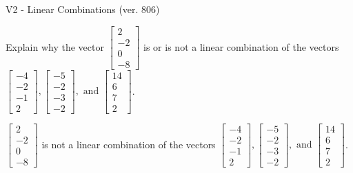 \begin{exercise}
  \begin{exerciseTitle}V2 - Linear Combinations (ver. 806)\end{exerciseTitle}
  \begin{exerciseStatement}
    Explain why the vector \(\left[\begin{array}{c}
2 \\
-2 \\
0 \\
-8
\end{array}\right]\)  is or is not a linear 
	combination of the vectors \(\left[\begin{array}{c}
-4 \\
-2 \\
-1 \\
2
\end{array}\right] , \left[\begin{array}{c}
-5 \\
-2 \\
-3 \\
-2
\end{array}\right] , \text{ and } \left[\begin{array}{c}
14 \\
6 \\
7 \\
2
\end{array}\right]\).
	


  \end{exerciseStatement}
  \begin{exerciseAnswer}
   \(\left[\begin{array}{c}
2 \\
-2 \\
0 \\
-8
\end{array}\right]\) 
  	 is not  
	a linear combination of the vectors \(\left[\begin{array}{c}
-4 \\
-2 \\
-1 \\
2
\end{array}\right] , \left[\begin{array}{c}
-5 \\
-2 \\
-3 \\
-2
\end{array}\right] , \text{ and } \left[\begin{array}{c}
14 \\
6 \\
7 \\
2
\end{array}\right]\).

	
  


  \end{exerciseAnswer}
\end{exercise}